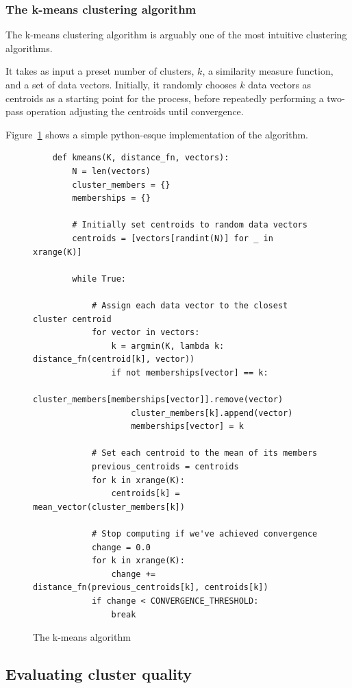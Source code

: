 \subsubsection{The k-means clustering algorithm}
\label{subs:kmeans}

The k-means clustering algorithm is arguably one of the most intuitive clustering algorithms.

It takes as input a preset number of clusters, $k$, a similarity measure function, and a set of data vectors. Initially, it randomly chooses $k$ data vectors as centroids as a starting point for the process, before repeatedly performing a two-pass operation adjusting the centroids until convergence.

Figure~\ref{fig:k-means} shows a simple python-esque implementation of the algorithm.

\begin{figure}[h]
  \begin{verbatim}
    def kmeans(K, distance_fn, vectors):
        N = len(vectors)
        cluster_members = {}
        memberships = {}

        # Initially set centroids to random data vectors
        centroids = [vectors[randint(N)] for _ in xrange(K)]

        while True:

            # Assign each data vector to the closest cluster centroid
            for vector in vectors:
                k = argmin(K, lambda k: distance_fn(centroid[k], vector))
                if not memberships[vector] == k:
                    cluster_members[memberships[vector]].remove(vector)
                    cluster_members[k].append(vector)
                    memberships[vector] = k

            # Set each centroid to the mean of its members
            previous_centroids = centroids
            for k in xrange(K):
                centroids[k] = mean_vector(cluster_members[k])

            # Stop computing if we've achieved convergence
            change = 0.0
            for k in xrange(K):
                change += distance_fn(previous_centroids[k], centroids[k])
            if change < CONVERGENCE_THRESHOLD:
                break
  \end{verbatim}

  \caption{The k-means algorithm}
  \label{fig:k-means}
\end{figure}

\subsection{Evaluating cluster quality}
\label{approach:sub:evaluating_clusters}

